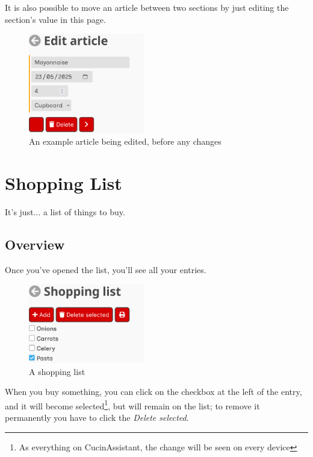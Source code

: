 \documentclass[12pt, a4paper]{report}
\begin{document}
	\label{movearticles} It is also possible to move an article between two sections by just editing the section's value in this page.

    \begin{figure}[H]
        \centering
        \includegraphics[width=0.45\textwidth]{assets/en/article.png}
        \caption{An example article being edited, before any changes}
    \end{figure}



    \chapter{Shopping List}

    It's just... a list of things to buy.

    \section{Overview}

    Once you've opened the list, you'll see all your entries.

    \begin{figure}[H]
        \centering
        \includegraphics[width=0.45\textwidth]{assets/en/shopping_list.png}
        \caption{A shopping list}
    \end{figure}

    When you buy something, you can click on the checkbox at the left of the entry, and it will become selected\footnote{As everything on
    CucinAssistant, the change will be seen on every device}, but will remain on the list; to remove it permanently you have to click the
    \emph{Delete selected}.
\end{document}
